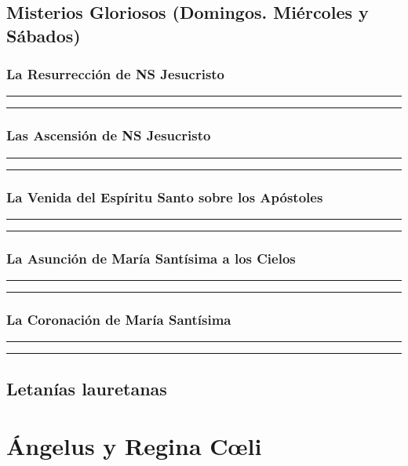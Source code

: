\documentclass[11pt,a4paper]{report}
\begin{document}
    

    \subsection*{Misterios Gloriosos (Domingos. Miércoles y Sábados)}

    \subsubsection*{La Resurrección de NS Jesucristo}
    
    
    \rule{\textwidth}{0.5pt}
    
    \rule{\textwidth}{0.5pt}
    

    \subsubsection*{Las Ascensión de NS Jesucristo}
    
    
    \rule{\textwidth}{0.5pt}
    
    \rule{\textwidth}{0.5pt}
    

    \subsubsection*{La Venida del Espíritu Santo sobre los Apóstoles}
    
    
    \rule{\textwidth}{0.5pt}
    
    \rule{\textwidth}{0.5pt}
    

    \subsubsection*{La Asunción de María Santísima a los Cielos}
    
    
    \rule{\textwidth}{0.5pt}
    
    \rule{\textwidth}{0.5pt}
    

    \subsubsection*{La Coronación de María Santísima}
    
    
    \rule{\textwidth}{0.5pt}
    
    \rule{\textwidth}{0.5pt}
    

    

    \subsection*{Letanías lauretanas}
    

    \section*{Ángelus y Regina Cœli}
    
    
\end{document}
